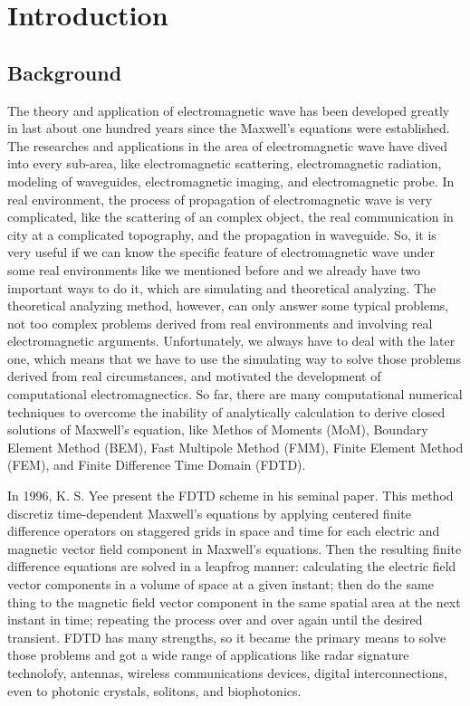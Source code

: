 
\chapter{Introduction}

\section{Background}
The theory and application of electromagnetic wave has been developed greatly in last about one hundred years since the Maxwell's equations were established. The researches and applications in the area of electromagnetic wave have dived into every sub-area,  like electromagnetic scattering, electromagnetic radiation, modeling of waveguides, electromagnetic imaging, and electromagnetic probe. In real environment, the process of propagation of electromagnetic wave is very complicated, like the scattering of an complex object, the real communication in city at a complicated topography, and the propagation in waveguide. So, it is very useful if we can know the specific feature of electromagnetic wave under some real environments like we mentioned before and we already have two important ways to do it, which are simulating and theoretical analyzing. The theoretical analyzing method, however, can only answer some typical problems, not too complex problems derived from real environments and involving real electromagnetic arguments. Unfortunately, we always have to deal with the later one, which means that we have to use the simulating way to solve those problems derived from real circumstances, and motivated the development of computational electromagnectics. So far, there are many computational numerical techniques to overcome the inability of analytically calculation to derive closed solutions of Maxwell's equation, like Methos of Moments (MoM), Boundary Element Method (BEM), Fast Multipole Method (FMM), Finite Element Method (FEM), and Finite Difference Time Domain (FDTD).

In 1996, K. S. Yee \cite{Yee} present the FDTD scheme in his seminal paper. This method discretiz time-dependent Maxwell's equations by applying centered finite difference operators on staggered grids in space and time for each electric and magnetic vector field component in Maxwell's equations. Then the resulting finite difference equations are solved in a leapfrog manner: calculating the electric field vector components in a volume of space at a given instant; then do the same thing to the magnetic field vector component in the same spatial area at the next instant in time; repeating the process over and over again until the desired transient. FDTD has many strengths, so it became the primary means to solve those problems and got a wide range of applications like radar signature technolofy, antennas, wireless communications devices, digital interconnections, even to photonic crystals, solitons, and biophotonics.

